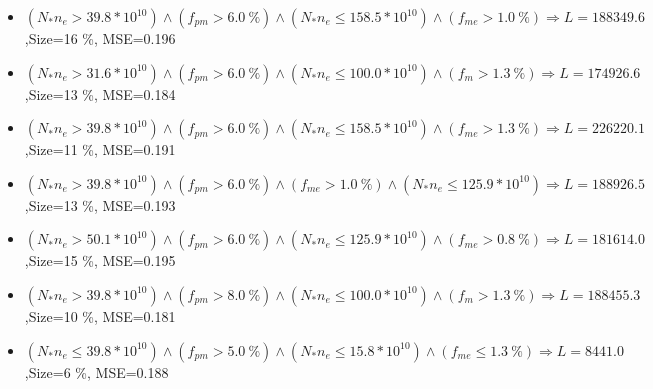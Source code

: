 \documentclass[numbered]{CSL}
\begin{document}
\begin{itemize}
\item $(N_* n_e > 39.8 * 10^{10}) \land (f_{pm} > 6.0~\%) \land (N_* n_e \leq 158.5 * 10^{10}) \land (f_{me} > 1.0~\%) \Rightarrow L = 188349.6$,\hfill Size=16 \%, MSE=0.196
\item $(N_* n_e > 31.6 * 10^{10}) \land (f_{pm} > 6.0~\%) \land (N_* n_e \leq 100.0 * 10^{10}) \land (f_m > 1.3~\%) \Rightarrow L = 174926.6$,\hfill Size=13 \%, MSE=0.184
\item $(N_* n_e > 39.8 * 10^{10}) \land (f_{pm} > 6.0~\%) \land (N_* n_e \leq 158.5 * 10^{10}) \land (f_{me} > 1.3~\%) \Rightarrow L = 226220.1$,\hfill Size=11 \%, MSE=0.191
\item $(N_* n_e > 39.8 * 10^{10}) \land (f_{pm} > 6.0~\%) \land (f_{me} > 1.0~\%) \land (N_* n_e \leq 125.9 * 10^{10}) \Rightarrow L = 188926.5$,\hfill Size=13 \%, MSE=0.193
\item $(N_* n_e > 50.1 * 10^{10}) \land (f_{pm} > 6.0~\%) \land (N_* n_e \leq 125.9 * 10^{10}) \land (f_{me} > 0.8~\%) \Rightarrow L = 181614.0$,\hfill Size=15 \%, MSE=0.195
\item $(N_* n_e > 39.8 * 10^{10}) \land (f_{pm} > 8.0~\%) \land (N_* n_e \leq 100.0 * 10^{10}) \land (f_m > 1.3~\%) \Rightarrow L = 188455.3$,\hfill Size=10 \%, MSE=0.181
\item $(N_* n_e \leq 39.8 * 10^{10}) \land (f_{pm} > 5.0~\%) \land (N_* n_e \leq 15.8 * 10^{10}) \land (f_{me} \leq 1.3~\%) \Rightarrow L = 8441.0$,\hfill Size=6 \%, MSE=0.188
\end{itemize}
\end{document}
